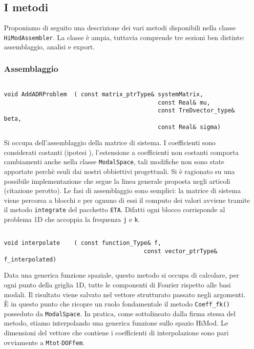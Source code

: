 \subsection{I metodi}
Proponiamo di seguito una descrizione dei vari metodi disponibili nella classe \texttt{HiModAssembler}. La classe \`e ampia, tuttavia comprende 
tre sezioni ben distinte: assemblaggio, analisi e export.
\subsubsection{Assemblaggio}
\begin{lstlisting}[style=general, frame = top]

void AddADRProblem	( const matrix_ptrType& systemMatrix,
											const Real& mu, 
											const TreDvector_type& beta, 
											const Real& sigma)
\end{lstlisting}
Si occupa dell'assemblaggio della matrice di sistema. I coefficienti sono considerati costanti (ipotesi ), l'estensione 
a coefficienti non costanti comporta cambiamenti anche nella classe \texttt{ModalSpace}, tali modifiche non sono state apportate perch\`e esuli 
dai nostri obbiettivi progettuali. Si \`e ragionato su una possibile implementazione che segue la linea generale proposta negli articoli 
(citazione perotto).
Le fasi di assemblaggio sono semplici: la matrice di sistema viene percorsa a blocchi e per ognuno di essi il computo dei valori avviene tramite 
il metodo \texttt{integrate} del pacchetto \texttt{ETA}. Difatti ogni blocco corrisponde al problema 1D che accoppia la frequenza \texttt{j} e 
\texttt{k}.

\begin{lstlisting}[style = general, frame = top]

void interpolate	( const function_Type& f,
										const vector_ptrType& f_interpolated)
\end{lstlisting}
Data una generica funzione spaziale, questo metodo si occupa di calcolare, per ogni punto della griglia 1D, tutte le componenti di Fourier 
rispetto alle basi modali. Il risultato viene salvato nel vettore strutturato passato negli argomenti. \`E in questo punto che ricopre un ruolo 
fondamentale il metodo \texttt{Coeff\_fk()} posseduto da \texttt{ModalSpace}.
In pratica, come sottolineato dalla firma stessa del metodo, stiamo interpolando una generica funzione sullo spazio HiMod. Le dimensioni del 
vettore che contiene i coefficienti di interpolazione sono pari ovviamente a \texttt{Mtot$\cdot$DOFfem}.

